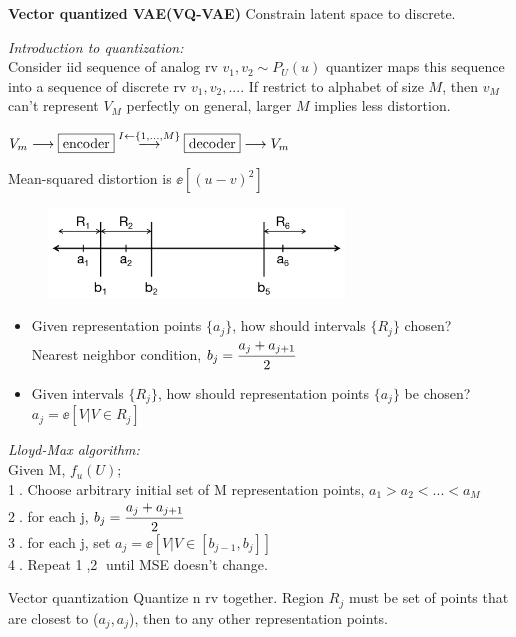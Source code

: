 \documentclass[12pt,a4paper]{article}
\begin{document}
\textbf{Vector quantized VAE(VQ-VAE)}
Constrain latent space to discrete. 

\textit{Introduction to quantization:} \\
Consider iid sequence of analog rv $v_1, v_2\sim P_U(u)$ quantizer maps this sequence into a sequence of discrete rv $v_1,v_2,...$. If restrict to alphabet of size $M$, then $v_M$ can't represent $V_M$ perfectly on general, larger $M$ implies less distortion. 

$V_m\longrightarrow \fbox{encoder} \overset{I\leftarrow\{1,...,M\}}{\longrightarrow} \fbox{decoder} \longrightarrow V_m$

Mean-squared distortion is $\ee[(u-v)^2]$

\vspace{2cm}
\begin{figure}[!ht]
    \centering
    \includegraphics[width=0.7\textwidth]{fig/vae_quant.png}
\end{figure}

\begin{itemize}
\item Given representation points $\{a_j\}$, how should intervals $\{R_j\}$ chosen? \\
Nearest neighbor condition, $b_j=\cfrac{a_j+a_{j+1}}{2}$
\item Given intervals $\{R_j\}$, how should representation points $\{a_j\}$ be chosen? \\
$a_j=\ee[V|V\in R_j]$
\end{itemize}

\textit{Lloyd-Max algorithm:}\\
Given M, $f_u(U)$;\\
\textcircled{1}. Choose arbitrary initial set of M representation points, $a_1>a_2<...<a_M$\\
\textcircled{2}. for each j, $b_j=\cfrac{a_j+a_{j+1}}{2}$\\
\textcircled{3}. for each j, set $a_j=\ee[V|V\in [b_{j-1}, b_j]]$\\
\textcircled{4}. Repeat \textcircled{1},\textcircled{2} until MSE doesn't change.

\vspace{0.5cm}
Vector quantization
Quantize n rv together. Region $R_j$ must be set of points that are closest to ($a_j, a_j$), then to any other representation points.
\end{document}
